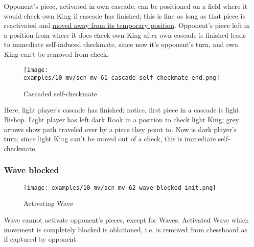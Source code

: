 \vspace*{-0.4\baselineskip}
Opponent's piece, activated in own cascade, can be positioned on a field where
it would check own King if cascade has finished; this is fine as long as that piece
is reactivated and
\hyperref[fig:scn_mv_45_activated_piece_check_init]{moved away from its temporary position}.
Opponent's piece left in a position from where it does check own King after own cascade
is finished leads to immediate self-induced checkmate, since now it's opponent's turn,
and own King can't be removed from check.

\clearpage %

\vspace*{-2.1\baselineskip}
\noindent
\begin{figure}[h]
\texttt{[image: examples/10\_mv/scn\_mv\_61\_cascade\_self\_checkmate\_end.png]}
\caption{Cascaded self-checkmate}
\label{fig:scn_mv_61_cascade_self_checkmate_end}
\end{figure}

Here, light player's cascade has finished; notice, first piece in a cascade is light
Bishop. Light player has left dark Rook in a position to check light King; grey arrows
show path traveled over by a piece they point to. Now is dark player's turn; since
light King can't be moved out of a check, this is immediate self-checkmate.

\clearpage %

\subsubsection*{Wave blocked}
\label{sec:Miranda's veil/Wave/Cascading opponent/Wave blocked}

\vspace*{-1.4\baselineskip}
\noindent
\begin{figure}[h]
\texttt{[image: examples/10\_mv/scn\_mv\_62\_wave\_blocked\_init.png]}
\caption{Activating Wave}
\label{fig:scn_mv_62_wave_blocked_init}
\end{figure}

Wave cannot activate opponent's pieces, except for Waves. Activated Wave which movement
is completely blocked is oblationed, i.e. is removed from chessboard as if captured by
opponent.

